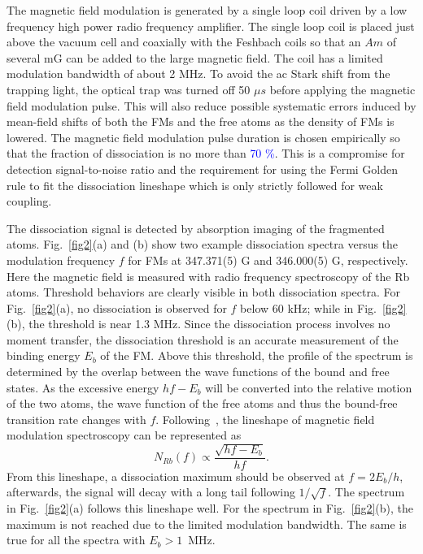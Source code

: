 The magnetic field modulation is generated by a single loop coil driven by a low frequency high power radio frequency amplifier. The single loop coil is placed just above the vacuum cell and coaxially with the Feshbach coils so that an $Am$ of several mG can be added to the large magnetic field. The coil has a limited modulation bandwidth of about 2 MHz. To avoid the ac Stark shift from the trapping light, the optical trap was turned off 50 $\mu s$ before applying the magnetic field modulation pulse. This will also reduce possible systematic errors induced by mean-field shifts of both the FMs and the free atoms as the density of FMs is lowered. The magnetic field modulation pulse duration is chosen empirically so that the fraction of dissociation is no more than \textcolor{blue}{70 \%}. This is a compromise for detection signal-to-noise ratio and the requirement for using the Fermi Golden rule to fit the dissociation lineshape which is only strictly followed for weak coupling. 

The dissociation signal is detected by absorption imaging of the fragmented \Rb atoms. Fig.~\ref{fig2}(a) and (b) show two example dissociation spectra versus the modulation frequency $f$ for FMs at 347.371(5) G and 346.000(5) G, respectively. Here the magnetic field is measured with radio frequency spectroscopy of the Rb atoms. Threshold behaviors are clearly visible in both dissociation spectra. For Fig.~\ref{fig2}(a), no dissociation is observed for $f$ below 60 kHz; while in Fig.~\ref{fig2}(b), the threshold is near 1.3 MHz. Since the dissociation process involves no moment transfer, the dissociation threshold is an accurate measurement of the binding energy $E_b$ of the FM. Above this threshold, the profile of the spectrum is determined by the overlap between the wave functions of the bound and free states. As the excessive energy $hf-E_b$ will be converted into the relative motion of the two atoms, the wave function of the free atoms and thus the bound-free transition rate changes with $f$. Following~\cite{Mohapatra2015}, the lineshape of magnetic field modulation spectroscopy can be represented as 
\begin{equation}
N_{Rb}(f) \propto \frac{\sqrt{hf-E_b}}{hf}.
\label{eq2}
\end{equation}
From this lineshape, a dissociation maximum should be observed at $f = 2E_b/h$, afterwards, the signal will decay with a long tail following $1/\sqrt{f}$. The spectrum in Fig.~\ref{fig2}(a) follows this lineshape well. For the spectrum in Fig.~\ref{fig2}(b), the maximum is not reached due to the limited modulation bandwidth. The same is true for all the spectra with $E_b>1$~MHz.   

